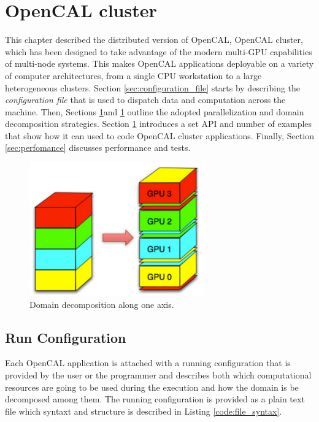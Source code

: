 \section{OpenCAL cluster}
This chapter described the distributed version of OpenCAL, OpenCAL cluster, which has been designed to take advantage of the modern multi-GPU capabilities of multi-node systems. This makes OpenCAL applications deployable on a variety of computer architectures, from a single CPU workstation to a large heterogeneous clusters. 
Section \ref{sec:configuration_file} starts by describing the \textit{configuration file} that is used to dispatch data and computation across the machine. Then, Sections \ref{}and \ref{}  outline the adopted parallelization and domain decomposition strategies. Section \ref{} introduces a set API and number of examples that show how it can used to code OpenCAL cluster applications. Finally, Section \ref{sec:perfomance} discusses performance and tests.
  \begin{figure}
	\begin{center}
		\includegraphics[width=0.67\textwidth]{./images/opencal/multigpu_domain_decomposition.png}
		\caption{Domain decomposition along one axis.}
		\label{fig:multigpu_domain_decomposition}
	\end{center}
\end{figure}



\subsection{Run Configuration}
\label{sec:run_configuration}
Each OpenCAL application is attached with a running configuration that is provided by the user or the programmer and describes both which computational resources are going to be used during the execution and how the domain is be decomposed among them.
The running configuration is provided as a plain text file which syntaxt and structure is described in Listing \ref{code:file_syntax}.



